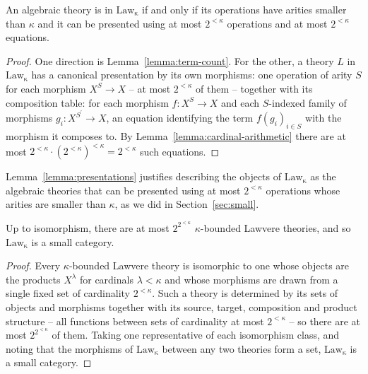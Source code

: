 \documentclass[acmsmall, screen, review, anonymous]{acmart}
\theoremstyle{definition}
\newcommand{\arr}{\rightarrow}
\newcommand{\lawc}{\mathrm{Law_{\kappa}}}
\newcommand{\types}{\mathrel{:}}
\begin{document}
\begin{lemma}
\label{lemma:presentations}
  An algebraic theory is in $\lawc$ if and only if its operations have
  arities smaller than $\kappa$ and it can be presented using at most
  $2^{<\kappa}$ operations and at most $2^{<\kappa}$ equations.
\end{lemma}
\begin{proof}
  One direction is Lemma~\ref{lemma:term-count}. For the other, a
  theory $L$ in $\lawc$ has a canonical presentation by its own
  morphisms: one operation of arity $S$ for each morphism
  $X^S \arr X$ -- at most $2^{<\kappa}$ of them -- together with its
  composition table: for each morphism $f \types X^{S} \arr X$ and each
  $S$-indexed family of morphisms $g_i \types X^{S^\prime} \arr X$, an
  equation identifying the term $f(g_i)_{i \in S}$ with the morphism it
  composes to. By Lemma~\ref{lemma:cardinal-arithmetic} there are at
  most $2^{<\kappa} \cdot (2^{<\kappa})^{<\kappa} = 2^{<\kappa}$ such
  equations.
\end{proof}

Lemma~\ref{lemma:presentations} justifies describing the objects of
$\lawc$ as the algebraic theories that can be presented using at most
$2^{<\kappa}$ operations whose arities are smaller than $\kappa$, as we
did in Section~\ref{sec:small}.

\begin{lemma}
\label{lemma:smallness}
  Up to isomorphism, there are at most $2^{2^{<\kappa}}$
  $\kappa$-bounded Lawvere theories, and so $\lawc$ is a small
  category.
\end{lemma}
\begin{proof}
  Every $\kappa$-bounded Lawvere theory is isomorphic to one whose
  objects are the products $X^{\lambda}$ for cardinals
  $\lambda < \kappa$ and whose morphisms are drawn from a single fixed
  set of cardinality $2^{<\kappa}$. Such a theory is determined by its
  sets of objects and morphisms together with its source, target,
  composition and product structure -- all functions between sets of
  cardinality at most $2^{<\kappa}$ -- so there are at most
  $2^{2^{<\kappa}}$ of them. Taking one
  representative of each isomorphism class, and noting that the
  morphisms of $\lawc$ between any two theories form a set, $\lawc$ is
  a small category.
\end{proof}
\end{document}
